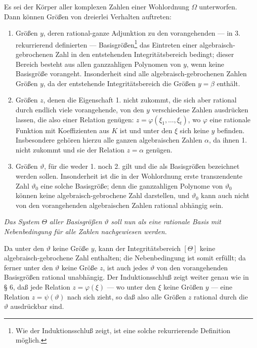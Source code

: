 \documentclass[11pt]{article}
\begin{document}
Es sei der Körper aller komplexen Zahlen einer Wohlordnung $\Omega$
unterworfen. Dann können Größen von dreierlei Verhalten auftreten:
\begin{enumerate}
\item[1.] Größen $y$, deren rational-ganze Adjunktion zu den vorangehenden ---
in 3. rekurrierend definierten --- Basisgrößen\footnote{Wie der Induktionsschluß
zeigt, ist eine solche rekurrierende Definition möglich.} das Eintreten einer
algebraisch-gebrochenen Zahl in den entstehenden Integritätsbereich bedingt;
dieser Bereich besteht aus allen ganzzahligen Polynomen von $y$, wenn keine
Basisgröße vorangeht. Insonderheit sind alle algebraisch-gebrochenen Zahlen
Größen $y$, da der entstehende Integritätsbereich die Größen $y=\beta$ enthält.
\item[2.] Größen $z$, denen die Eigenschaft 1. nicht zukommt, die sich aber
rational durch endlich viele vorangehende, von den $y$ verschiedene Zahlen
ausdrücken lassen, die also einer Relation genügen:
$z=\varphi(\xi_1,\ldots,\xi_t)$, wo $\varphi$ eine rationale Funktion mit
Koeffizienten aus $K$ ist und unter den $\xi$ sich keine $y$ befinden.
Insbesondere gehören hierzu alle ganzen algebraischen Zahlen $\alpha$, da ihnen
1. nicht zukommt und sie der Relation $z=\alpha$ genügen.
\item[3.] Größen $\vartheta$, für die weder 1. noch 2. gilt und die als
Basisgrößen bezeichnet werden sollen. Insonderheit ist die in der Wohlordnung
erste transzendente Zahl $\vartheta_0$ eine solche Basisgröße; denn die
ganzzahligen Polynome von $\vartheta_0$ können keine algebraisch-gebrochene
Zahl darstellen, und $\vartheta_0$ kann auch nicht von den vorangehenden
algebraischen Zahlen rational abhängig sein.
\end{enumerate}

\emph{Das System $\Theta$ aller Basisgrößen $\vartheta$ soll nun als eine
rationale Basis mit Nebenbedingung für alle Zahlen nachgewiesen werden.}

Da unter den $\vartheta$ keine Größe $y$, kann der Integritätsbereich $[\Theta]$
keine algebraisch-gebrochene Zahl enthalten; die Nebenbedingung ist somit
erfüllt; da ferner unter den $\vartheta$ keine Größe $z$, ist auch jedes
$\vartheta$ von den vorangehenden Basisgrößen rational unabhängig. Der
Induktionsschluß zeigt weiter genau wie in § 6, daß jede Relation
$z=\varphi(\xi)$ --- wo unter den $\xi$ keine Größen $y$ --- eine Relation
$z=\psi(\vartheta)$ nach sich zieht, so daß also alle Größen $z$ rational durch
die $\vartheta$ ausdrückbar sind.
\end{document}
